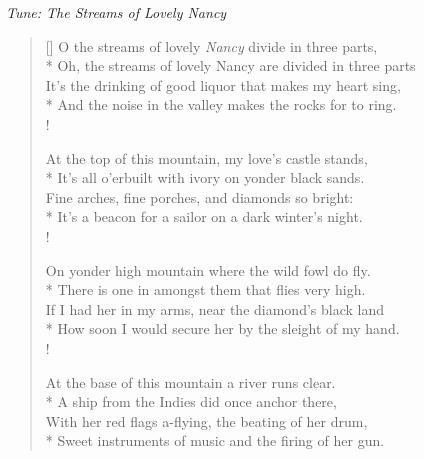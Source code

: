 \documentclass[MAIN]{subfiles}
\begin{document}
\begin{center}
\emph{Tune: The Streams of Lovely Nancy}
\end{center}

\bigskip

\settowidth{\versewidth}{Well you see, mister farmer, I've come for your wife.}
\begin{verse}[\versewidth]
O the streams of lovely \emph{Nancy} divide in three parts,\\*
Oh, the streams of lovely Nancy are divided in three parts\\
It's the drinking of good liquor that makes my heart sing,\\*
And the noise in the valley makes the rocks for to ring.\\!

At the top of this mountain, my love's castle stands,\\*
It's all o'erbuilt with ivory on yonder black sands.\\
Fine arches, fine porches, and diamonds so bright:\\*
It's a beacon for a sailor on a dark winter's night.\\!

On yonder high mountain where the wild fowl do fly.\\*
There is one in amongst them that flies very high.\\
If I had her in my arms, near the diamond's black land\\*
How soon I would secure her by the sleight of my hand.\\!

At the base of this mountain a river runs clear.\\*
A ship from the Indies did once anchor there,\\
With her red flags a-flying, the beating of her drum,\\*
Sweet instruments of music and the firing of her gun.
\end{verse}
\end{document}

